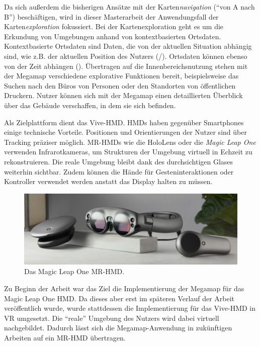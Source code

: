 Da sich außerdem die bisherigen Ansätze mit der Karten\emph{navigation} (\enquote{von A nach B}) beschäftigen, wird in dieser Masterarbeit der Anwendungsfall der Karten\emph{exploration} fokussiert.
Bei der Kartenexploration geht es um die Erkundung von Umgebungen anhand von kontextbasierten Ortsdaten.
Kontextbasierte Ortsdaten sind Daten, die von der aktuellen Situation abhängig sind, wie z.B. der aktuellen Position des Nutzers (/).
Ortsdaten können ebenso von der Zeit abhängen ().
Übertragen auf die Innenbereichsnutzung stehen mit der Megamap verschiedene explorative Funktionen bereit, beispielsweise das Suchen nach den Büros von Personen oder den Standorten von öffentlichen Druckern.
Nutzer können sich mit der Megamap einen detaillierten Überblick über das Gebäude verschaffen, in dem sie sich befinden.

Als Zielplattform dient das Vive-HMD.
HMDs haben gegenüber Smartphones einige technische Vorteile.
Positionen und Orientierungen der Nutzer sind über Tracking präziser möglich.
MR-HMDs wie die HoloLens oder die \emph{Magic Leap One} \parencite[siehe \autoref{fig:magic_leap}]{MagicLeap2018} verwenden Infrarotkameras, um Strukturen der Umgebung virtuell in Echzeit zu rekonstruieren.
Die reale Umgebung bleibt dank des durchsichtigen Glases weiterhin sichtbar.
Zudem können die Hände für Gesteninteraktionen oder Kontroller verwendet werden anstatt das Display halten zu müssen.
\begin{figure}[tb]
    \centering
    \includegraphics[width=\textwidth]{figures/magic_leap_one}
    \caption{Das Magic Leap One MR-HMD. }
    \label{fig:magic_leap}
\end{figure}

Zu Beginn der Arbeit war das Ziel die Implementierung der Megamap für das Magic Leap One HMD.
Da dieses aber erst im späteren Verlauf der Arbeit veröffentlich wurde, wurde stattdessen die Implementierung für das Vive-HMD in VR umgesetzt.
Die \enquote{reale} Umgebung des Nutzers wird dabei virtuell nachgebildet.
Dadurch lässt sich die Megamap-Anwendung in zukünftigen Arbeiten auf ein MR-HMD übertragen.

